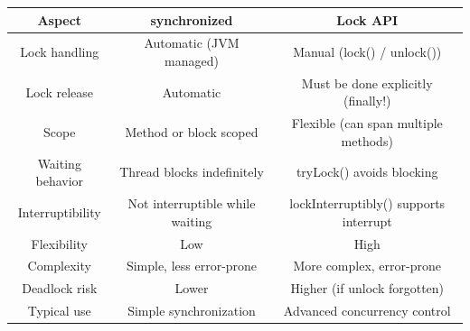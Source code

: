 \begin{tabular}{|c|c|c|}
\hline
\textbf{Aspect} & \textbf{synchronized} & \textbf{Lock API} \\\hline
Lock handling & Automatic (JVM managed) & Manual (lock() / unlock()) \\\hline
Lock release & Automatic & Must be done explicitly (finally!) \\\hline
Scope & Method or block scoped & Flexible (can span multiple methods) \\\hline
Waiting behavior & Thread blocks indefinitely & tryLock() avoids blocking \\\hline
Interruptibility & Not interruptible while waiting & lockInterruptibly() supports interrupt \\\hline
Flexibility & Low & High \\\hline
Complexity & Simple, less error-prone & More complex, error-prone \\\hline
Deadlock risk & Lower & Higher (if unlock forgotten) \\\hline
Typical use & Simple synchronization & Advanced concurrency control \\\hline
\end{tabular}

